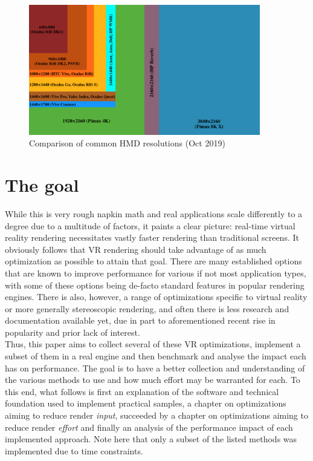 \begin{figure}[htb]
  \centering
  \includegraphics[width=0.9\textwidth]{pictures/VR_headset_resolution_per_eye_comparison}
  \caption{Comparison of common HMD resolutions (Oct 2019)\cite{VeikkoMakela.2019}} \label{fig:VR_HMD_res}
\end{figure} 

\section{The goal}
While this is very rough napkin math and real applications scale differently to a degree due to a multitude of factors, it paints a clear picture: real-time virtual reality rendering necessitates vastly faster rendering than traditional screens. It obviously follows that VR rendering should take advantage of as much optimization as possible to attain that goal. There are many established options that are known to improve performance for various if not most application types, with some of these options being de-facto standard features in popular rendering engines.  There is also, however, a range of optimizations specific to virtual reality or more generally stereoscopic rendering, and often there is less research and documentation available yet, due in part to aforementioned recent rise in popularity and prior lack of interest. \\
Thus, this paper aims to collect several of these VR optimizations, implement a subset of them in a real engine and then benchmark and analyse the impact each has on performance. The goal is to have a better collection and understanding of the various methods to use and how much effort may be warranted for each. 
To this end, what follows is first an explanation of the software and technical foundation used to implement practical samples, a chapter on optimizations aiming to reduce render \textit{input}, succeeded by a chapter on optimizations aiming to reduce render \textit{effort} and finally an analysis of the performance impact of each implemented approach. Note here that only a subset of the listed methods was implemented due to time constraints. 

